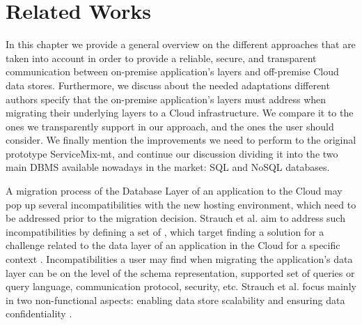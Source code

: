 \chapter{Related Works}
\label{chap:relatedworks}

In this chapter we provide a general overview on the different approaches that are taken into account in order to provide a reliable, secure, and transparent communication between on-premise application's layers and off-premise Cloud data stores. Furthermore, we discuss about the needed adaptations different authors specify that the on-premise application's layers must address when migrating their underlying layers to a Cloud infrastructure. We compare it to the ones we transparently support in our approach, and the ones the user should consider. We finally mention the improvements we need to perform to the original prototype ServiceMix-mt, and continue our discussion dividing it into the two main \ac{DBMS} available nowadays in the market: \ac{SQL} and \ac{NoSQL} databases.

A migration process of the Database Layer of an application to the Cloud may pop up several incompatibilities with the new hosting environment, which need to be addressed prior to the migration decision. Strauch et al. aim to address such incompatibilities by defining a set of , which target finding a solution for a challenge related to the data layer of an application in the Cloud for a specific context \cite{strauchABKL2012}. Incompatibilities a user may find when migrating the application's data layer can be on the level of the schema representation, supported set of queries or query language, communication protocol, security, etc. Strauch et al. focus mainly in two non-functional aspects: enabling data store scalability and ensuring data confidentiality \cite{strauchABKL2012}. 

